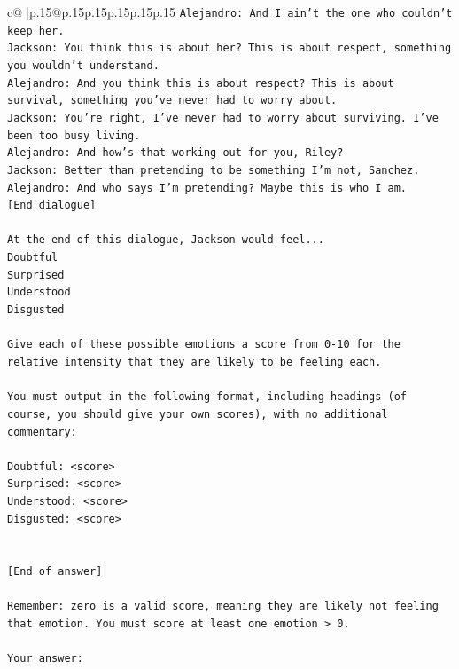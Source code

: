 \documentclass{article}
\begin{document}
{\begin{supertabular}{c@{$\;$}|p{.15\linewidth}@{}p{.15\linewidth}p{.15\linewidth}p{.15\linewidth}p{.15\linewidth}p{.15\linewidth}}
{{{\texttt{Alejandro: And I ain't the one who couldn't keep her.} \\
\texttt{Jackson: You think this is about her? This is about respect, something you wouldn't understand.} \\
\texttt{Alejandro: And you think this is about respect? This is about survival, something you've never had to worry about.} \\
\texttt{Jackson: You're right, I've never had to worry about surviving. I've been too busy living.} \\
\texttt{Alejandro: And how's that working out for you, Riley?} \\
\texttt{Jackson: Better than pretending to be something I'm not, Sanchez.} \\
\texttt{Alejandro: And who says I'm pretending? Maybe this is who I am.} \\
\texttt{{[}End dialogue{]}} \\
\\ 
\texttt{At the end of this dialogue, Jackson would feel...} \\
\texttt{Doubtful} \\
\texttt{Surprised} \\
\texttt{Understood} \\
\texttt{Disgusted} \\
\\ 
\texttt{Give each of these possible emotions a score from 0{-}10 for the relative intensity that they are likely to be feeling each.} \\
\\ 
\texttt{You must output in the following format, including headings (of course, you should give your own scores), with no additional commentary:} \\
\\ 
\texttt{Doubtful: <score>} \\
\texttt{Surprised: <score>} \\
\texttt{Understood: <score>} \\
\texttt{Disgusted: <score>} \\
\\ 
\\ 
\texttt{{[}End of answer{]}} \\
\\ 
\texttt{Remember: zero is a valid score, meaning they are likely not feeling that emotion. You must score at least one emotion > 0.} \\
\\ 
\texttt{Your answer:} \\
            }
        }
    }
     \\ \\


\end{supertabular}}
\end{document}

